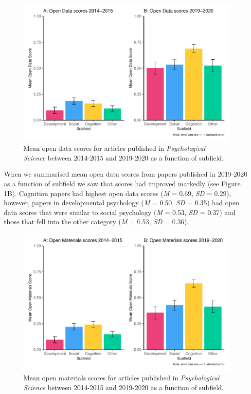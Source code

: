 \documentclass[
  english,
  man,floatsintext]{apa6}
\begin{document}
\begin{figure}
\centering
\includegraphics{icd_special_issue_revision_FINAL_files/figure-latex/unnamed-chunk-2-1.pdf}
\caption{\label{fig:unnamed-chunk-2}Mean open data scores for articles published in \emph{Psychological Science} between 2014-2015 and 2019-2020 as a function of subfield.}
\end{figure}

When we summarised mean open data scores from papers published in 2019-2020 as a function of subfield we saw that scores had improved markedly (see Figure 1B). Cognition papers had highest open data scores (\emph{M} = 0.69, \emph{SD} = 0.29), however, papers in developmental psychology (\emph{M} = 0.50, \emph{SD} = 0.35) had open data scores that were similar to social psychology (\emph{M} = 0.53, \emph{SD} = 0.37) and those that fell into the other category (\emph{M} = 0.53, \emph{SD} = 0.36).

\begin{figure}
\centering
\includegraphics{icd_special_issue_revision_FINAL_files/figure-latex/unnamed-chunk-3-1.pdf}
\caption{\label{fig:unnamed-chunk-3}Mean open materials scores for articles published in \emph{Psychological Science} between 2014-2015 and 2019-2020 as a function of subfield.}
\end{figure}
\end{document}
